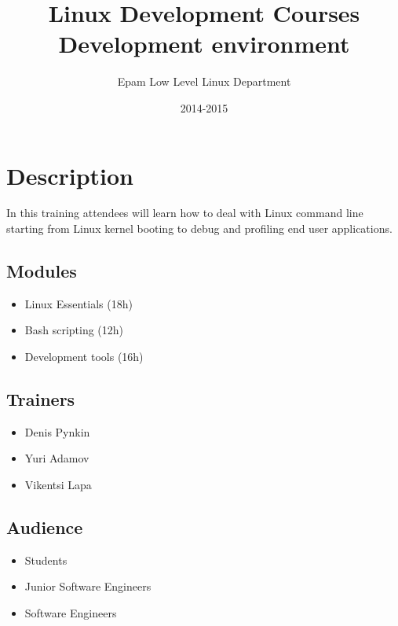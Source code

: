 \documentclass[12pt,a4paper,oneside]{article}
\begin{document}
\title{Linux Development Courses\\Development environment}
\author{Epam Low Level Linux Department}
\date{2014-2015}
\maketitle





\section{Description}

In this training attendees will learn how to deal with Linux command line
starting from Linux kernel booting to debug and profiling end user applications.

\subsection{Modules}
\begin{itemize}
	\item Linux Essentials (18h)
	\item Bash scripting (12h)
	\item Development tools (16h)
\end{itemize}

\subsection{Trainers}
\begin{itemize}
	\item Denis Pynkin
	\item Yuri Adamov
	\item Vikentsi Lapa
\end{itemize}

\subsection{Audience}
\begin{itemize}
	\item Students
	\item Junior Software Engineers
	\item Software Engineers
\end{itemize}
\end{document}

